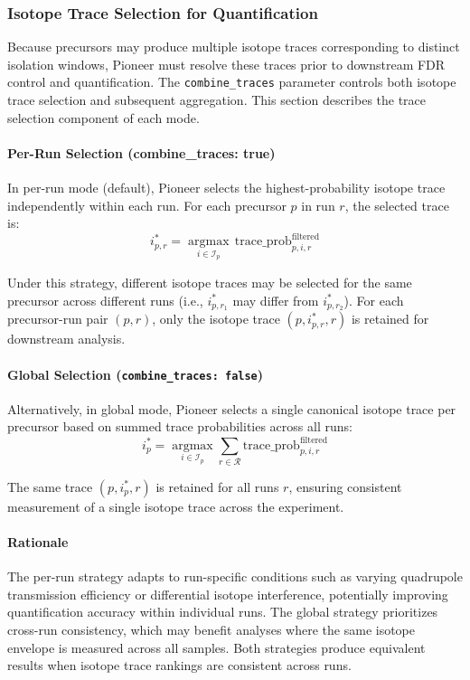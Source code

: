 \documentclass[pdflatex,sn-nature]{sn-jnl}
\begin{document}
\subsubsection{Isotope Trace Selection for Quantification}\label{subsubsec:isotope-trace-selection}

Because precursors may produce multiple isotope traces corresponding to distinct isolation windows, Pioneer must resolve these traces prior to downstream FDR control and quantification. The \texttt{combine\_traces} parameter controls both isotope trace selection and subsequent aggregation. This section describes the trace selection component of each mode.

\paragraph{Per-Run Selection (combine\_traces: true)}\label{para:per-run-selection}
In per-run mode (default), Pioneer selects the highest-probability isotope trace independently within each run. For each precursor $p$ in run $r$, the selected trace is:
\begin{equation}
  i^*_{p,r} = \underset{i \in \mathcal{I}_p}{\operatorname{argmax}} \, \text{trace\_prob}_{p,i,r}^{\text{filtered}}
\end{equation}

Under this strategy, different isotope traces may be selected for the same precursor across different runs (i.e., $i^*_{p,r_1}$ may differ from $i^*_{p,r_2}$). For each precursor-run pair $(p,r)$, only the isotope trace $(p, i^*_{p,r}, r)$ is retained for downstream analysis.

\paragraph{Global Selection (\texttt{combine\_traces: false})}\label{para:global-selection}
Alternatively, in global mode, Pioneer selects a single canonical isotope trace per precursor based on summed trace probabilities across all runs:
\begin{equation}
  i^*_{p} = \underset{i \in \mathcal{I}_p}{\operatorname{argmax}} \sum_{r \in \mathcal{R}} \text{trace\_prob}_{p,i,r}^{\text{filtered}}
\end{equation}

The same trace $(p,i^*_p,r)$ is retained for all runs $r$, ensuring consistent measurement of a single isotope trace across the experiment.

\paragraph{Rationale}\label{para:selection-rationale}
The per-run strategy adapts to run-specific conditions such as varying quadrupole transmission efficiency or differential isotope interference, potentially improving quantification accuracy within individual runs. The global strategy prioritizes cross-run consistency, which may benefit analyses where the same isotope envelope is measured across all samples. Both strategies produce equivalent results when isotope trace rankings are consistent across runs.
\end{document}
